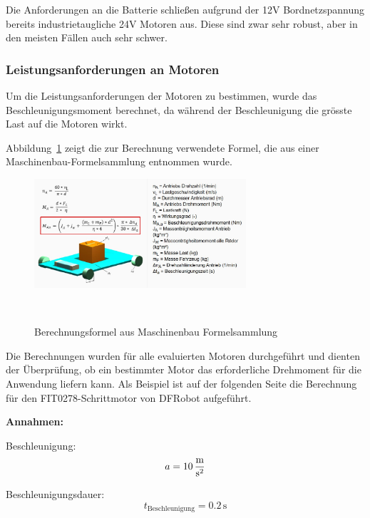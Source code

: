 \documentclass[main.  tex]{subfiles} %
\begin{document}
Die Anforderungen an die Batterie schließen aufgrund der 12V Bordnetzspannung
bereits industrietaugliche 24V Motoren aus. Diese sind zwar sehr robust, aber
in den meisten Fällen auch sehr schwer.

\newpage

\subsubsection*{Leistungsanforderungen an Motoren}
Um die Leistungsanforderungen der Motoren zu bestimmen, wurde das Beschleunigungsmoment 
berechnet, da während der Beschleunigung die grösste Last auf die Motoren wirkt. 

Abbildung~\ref{fig:Formel_Beschleunigungsmoment} zeigt die zur Berechnung verwendete 
Formel, die aus einer Maschinenbau-Formelsammlung entnommen wurde.

\begin{figure}[H]
    \centering
    \includegraphics[width=0.7\textwidth]{./fig_Antriebe/Formel_Beschleunigungsmoment.pdf}
    \caption{Berechnungsformel aus Maschinenbau Formelsammlung}~\label{fig:Formel_Beschleunigungsmoment}
\end{figure}

Die Berechnungen wurden für alle evaluierten Motoren durchgeführt und dienten der 
Überprüfung, ob ein bestimmter Motor das erforderliche Drehmoment für die Anwendung 
liefern kann. Als Beispiel ist auf der folgenden Seite die Berechnung für den 
FIT0278-Schrittmotor von DFRobot aufgeführt.

\newpage

\textbf{Annahmen:}

\vspace{0.2cm}

Beschleunigung:
\[
a = 10 \, \si{\frac{\meter}{\second\squared}}
\]

\vspace{0.2cm}

Beschleunigungsdauer:
\[
t_{\text{Beschleunigung}} = 0.2 \, \si{\second}
\]
\end{document}
